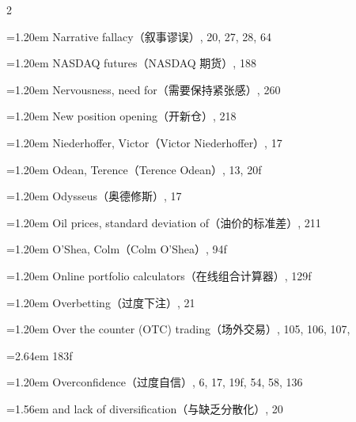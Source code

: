 {\begin{multicols}{2}
\par \noindent\hangindent=1.20em\hspace*{0.00em} Narrative fallacy（叙事谬误）, 20, 27, 28, 64
\par \noindent\hangindent=1.20em\hspace*{0.00em} NASDAQ futures（NASDAQ 期货）, 188
\par \noindent\hangindent=1.20em\hspace*{0.00em} Nervousness, need for（需要保持紧张感）, 260
\par \noindent\hangindent=1.20em\hspace*{0.00em} New position opening（开新仓）, 218
\par \noindent\hangindent=1.20em\hspace*{0.00em} Niederhoffer, Victor（Victor Niederhoffer）, 17
\par \noindent\hangindent=1.20em\hspace*{0.00em} Odean, Terence（Terence Odean）, 13, 20f
\par \noindent\hangindent=1.20em\hspace*{0.00em} Odysseus（奥德修斯）, 17
\par \noindent\hangindent=1.20em\hspace*{0.00em} Oil prices, standard deviation of（油价的标准差）, 211
\par \noindent\hangindent=1.20em\hspace*{0.00em} O’Shea, Colm（Colm O’Shea）, 94f
\par \noindent\hangindent=1.20em\hspace*{0.00em} Online portfolio calculators（在线组合计算器）, 129f
\par \noindent\hangindent=1.20em\hspace*{0.00em} Overbetting（过度下注）, 21
\par \noindent\hangindent=1.20em\hspace*{0.00em} Over the counter (OTC) trading（场外交易）, 105, 106, 107,
\par \noindent\hangindent=2.64em\hspace*{1.44em} 183f
\par \noindent\hangindent=1.20em\hspace*{0.00em} Overconfidence（过度自信）, 6, 17, 19f, 54, 58, 136
\par \noindent\hangindent=1.56em\hspace*{0.36em} and lack of diversification（与缺乏分散化）, 20

\end{multicols}}
